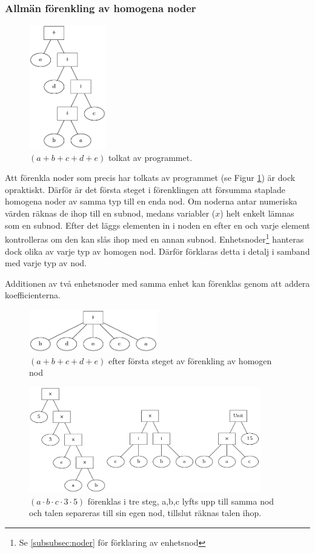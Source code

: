 \documentclass[12pt,a4paper]{article}
\begin{document}
\subsubsection{Allmän förenkling av homogena noder}
\label{subsubsec:förenkling_homogena}
\begin{figure}[h!]
  \centering
  \includegraphics[width=0.3\textwidth]{image22}
  \caption{\((a + b + c + d + e)\) tolkat av programmet.}
  \label{fig:2311}
\end{figure}
Att förenkla noder som precis har tolkats av programmet (se Figur \ref{fig:2311}) är dock opraktiskt. Därför är det första steget i förenklingen att försumma staplade homogena noder av samma typ till en enda nod. Om noderna antar numeriska värden räknas de ihop till en subnod, medans variabler (\(x\)) helt enkelt lämnas som en subnod. Efter det läggs elementen in i noden en efter en och varje element kontrolleras om den kan slås ihop med en annan subnod. Enhetsnoder\footnote{Se \ref{subsubsec:noder} för förklaring av enhetsnod} hanteras dock olika av varje typ av homogen nod. Därför förklaras detta i detalj i samband med varje typ av nod.\par
Additionen av två enhetsnoder med samma enhet kan förenklas genom att addera koefficienterna.
\begin{figure}[h!]
  \centering
  \includegraphics[width=0.5\textwidth]{image16}
  \caption{\((a + b + c + d + e)\) efter första steget av förenkling av homogen nod}
  \label{fig:2312}
\end{figure}
\begin{figure}[h!]
  \centering
  \includegraphics[width=0.9\textwidth]{image-merged}
  \caption{\((a \cdot b \cdot c \cdot 3 \cdot 5)\) förenklas i tre steg, a,b,c lyfts upp till samma nod och talen separeras till sin egen nod, tillslut räknas talen ihop.}
  \label{fig:2313}
\end{figure}
\end{document}
